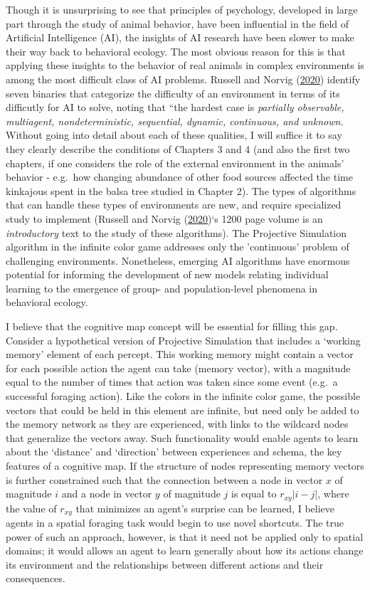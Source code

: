 \documentclass[twoside,12pt,final]{ucthesis-CA2012}
\begin{document}
\begin{ucmainmatter}
Though it is unsurprising to see that principles of psychology, developed in large part through the study of animal behavior, have been influential in the field of Artificial Intelligence (AI), the insights of AI research have been slower to make their way back to behavioral ecology. The most obvious reason for this is that applying these insights to the behavior of real animals in complex environments is among the most difficult class of AI problems. Russell and Norvig (\protect\hyperlink{ref-russell2020}{2020}) identify seven binaries that categorize the difficulty of an environment in terms of its difficutly for AI to solve, noting that ``the hardest case is \emph{partially observable, multiagent, nondeterministic, sequential, dynamic, continuous, and unknown.} Without going into detail about each of these qualities, I will suffice it to say they clearly describe the conditions of Chapters 3 and 4 (and also the first two chapters, if one considers the role of the external environment in the animals' behavior - e.g.~how changing abundance of other food sources affected the time kinkajous spent in the balsa tree studied in Chapter 2). The types of algorithms that can handle these types of environments are new, and require specialized study to implement (Russell and Norvig (\protect\hyperlink{ref-russell2020}{2020})`s 1200 page volume is an \emph{introductory} text to the study of these algorithms). The Projective Simulation algorithm in the infinite color game addresses only the 'continuous' problem of challenging environments. Nonetheless, emerging AI algorithms have enormous potential for informing the development of new models relating individual learning to the emergence of group- and population-level phenomena in behavioral ecology.

I believe that the cognitive map concept will be essential for filling this gap. Consider a hypothetical version of Projective Simulation that includes a `working memory' element of each percept. This working memory might contain a vector for each possible action the agent can take (memory vector), with a magnitude equal to the number of times that action was taken since some event (e.g.~a successful foraging action). Like the colors in the infinite color game, the possible vectors that could be held in this element are infinite, but need only be added to the memory network as they are experienced, with links to the wildcard nodes that generalize the vectors away. Such functionality would enable agents to learn about the `distance' and `direction' between experiences and schema, the key features of a cognitive map. If the structure of nodes representing memory vectors is further constrained such that the connection between a node in vector \(x\) of magnitude \(i\) and a node in vector \(y\) of magnitude \(j\) is equal to \(r_{xy} \lvert i-j \rvert\), where the value of \(r_{xy}\) that minimizes an agent's surprise can be learned, I believe agents in a spatial foraging task would begin to use novel shortcuts. The true power of such an approach, however, is that it need not be applied only to spatial domains; it would allows an agent to learn generally about how its actions change its environment and the relationships between different actions and their consequences.


\end{ucmainmatter}
\end{document}
